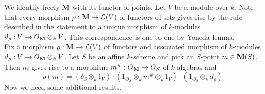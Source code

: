 We identify freely $\mathbf{M}$ with its functor of points. Let $V$ be a module over $k$. Note that every morphism $\rho:\mathbf{M}\rightarrow {\mathcal L}(V)$ of functors of sets gives rise by the rule described in the statement to a unique morphism of $k$-modules $d_{\rho}:V\rightarrow O_{\mathbf{M}}\otimes_{k}V$. This correspondence is one to one by Yoneda lemma.\\
Fix a morphism $\rho:\mathbf{M}\rightarrow {\mathcal L}(V)$ of functors and associated morphism of $k$-modules $d_{\rho}:V\rightarrow O_{\mathbf{M}}\otimes_{k}V$. Let $S$ be an affine $k$-scheme and pick an $S$-point $m\in \mathbf{M}(S)$. Then $m$ gives rise to a morphism $m^{\#}:O_{\mathbf{M}}\rightarrow O_S$ of $k$-algebras and
$$\rho(m)=\left(\delta_S\otimes_{k}1_V\right)\cdot \left(1_{O_S}\otimes_{k}m^{\#}\otimes_{k}1_V\right)\cdot \left(1_{O_S}\otimes_{k}d_{\rho}\right)$$
Now we need some additional results.

